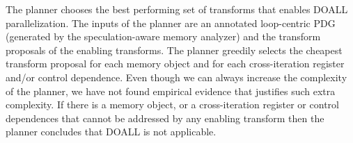 The planner chooses the best performing set of transforms that enables
DOALL parallelization.
%
The inputs of the planner are an annotated loop-centric PDG (generated
by the speculation-aware memory analyzer) and the transform proposals
of the enabling transforms.
%
%
%
The planner greedily selects the cheapest transform proposal for each
memory object and for each cross-iteration register and/or control
dependence.
%
%
Even though we can always increase the complexity of the planner, we
have not found empirical evidence that justifies such extra
complexity.
%
If there is a memory object, or a cross-iteration register or control
dependences that cannot be addressed by any enabling transform then
the planner concludes that DOALL is not applicable.
%
%
%
